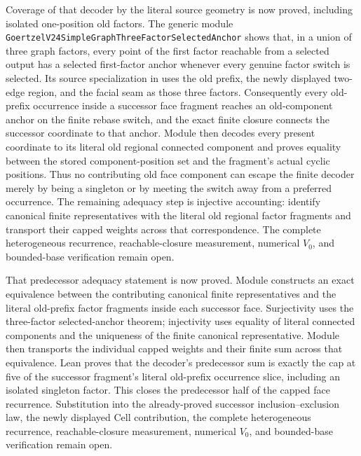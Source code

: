 \documentclass[11pt]{article}
\theoremstyle{definition}
\begin{document}
Coverage of that decoder by the literal source geometry is now proved,
including isolated one-position old factors.
The generic module
\texttt{GoertzelV24SimpleGraphThreeFactorSelectedAnchor} shows that, in a
union of three graph factors, every point of the first factor reachable from
a selected output has a selected first-factor anchor whenever every genuine
factor switch is selected.  Its source specialization in
uses the old prefix, the newly displayed two-edge region, and the facial seam
as those three factors.  Consequently every old-prefix occurrence inside a
successor face fragment reaches an old-component anchor on the finite rebase
switch, and the exact finite closure connects the successor coordinate to
that anchor.  Module
then decodes every present coordinate to its literal old regional connected
component and proves equality between the stored component-position set and
the fragment's actual cyclic positions.  Thus no contributing old face
component can escape the finite decoder merely by being a singleton or by
meeting the switch away from a preferred occurrence.  The remaining adequacy
step is injective accounting: identify canonical finite representatives with
the literal old regional factor fragments and transport their capped weights
across that correspondence.  The complete heterogeneous recurrence,
reachable-closure measurement, numerical $V_0$, and bounded-base verification
remain open.

That predecessor adequacy statement is now proved.  Module
constructs an exact equivalence between the contributing canonical finite
representatives and the literal old-prefix factor fragments inside each
successor face.  Surjectivity uses the three-factor selected-anchor theorem;
injectivity uses equality of literal connected components and the uniqueness
of the finite canonical representative.  Module
then transports the individual capped weights and their finite sum across that
equivalence.  Lean proves that the decoder's predecessor sum is exactly the
cap at five of the successor fragment's literal old-prefix occurrence slice,
including an isolated singleton factor.  This closes the predecessor half of
the capped face recurrence.  Substitution into the already-proved successor
inclusion--exclusion law, the newly displayed Cell contribution, the complete
heterogeneous recurrence, reachable-closure measurement, numerical $V_0$,
and bounded-base verification remain open.
\end{document}
